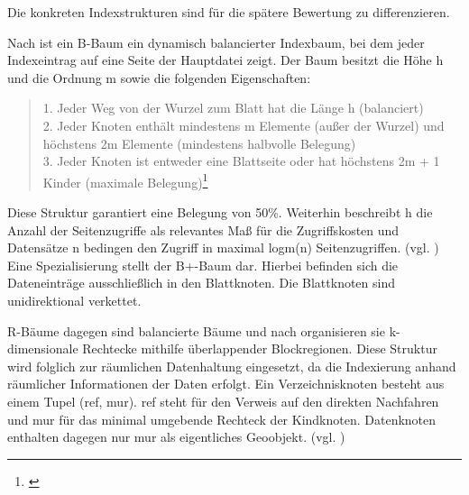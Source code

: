 Die konkreten Indexstrukturen sind für die spätere Bewertung zu differenzieren.


Nach \cite[S.288]{book:kudrass} ist ein B-Baum ein dynamisch balancierter Indexbaum, bei dem jeder Indexeintrag auf eine Seite der Hauptdatei zeigt.
Der Baum besitzt die Höhe h und die Ordnung m sowie die folgenden Eigenschaften:
\begin{quote}
1. Jeder Weg von der Wurzel zum Blatt hat die Länge h (balanciert)\\
2. Jeder Knoten enthält mindestens m Elemente (außer der Wurzel) und  höchstens 2m Elemente (mindestens halbvolle Belegung)\\
3. Jeder Knoten ist entweder eine Blattseite oder hat höchstens 2m + 1 Kinder (maximale Belegung)\footnote{\cite[S.284]{book:kudrass}}
\end{quote}
Diese Struktur garantiert eine Belegung von 50\%.
Weiterhin beschreibt h die Anzahl der Seitenzugriffe als relevantes Maß für die Zugriffskosten und Datensätze n bedingen den Zugriff in maximal logm(n) Seitenzugriffen. (vgl. \cite[S.288]{book:kudrass})
Eine Spezialisierung stellt der B+-Baum dar.
Hierbei befinden sich die Dateneinträge ausschließlich in den Blattknoten.
Die Blattknoten sind unidirektional verkettet.
%

R-Bäume dagegen sind balancierte Bäume und nach \cite[S. 523]{book:kudrass} organisieren sie k-dimensionale Rechtecke mithilfe überlappender Blockregionen.
Diese Struktur wird folglich zur räumlichen Datenhaltung eingesetzt, da die Indexierung anhand räumlicher Informationen der Daten erfolgt.
Ein Verzeichnisknoten besteht aus einem Tupel (ref, mur).
ref steht für den Verweis auf den direkten Nachfahren und mur für das minimal umgebende Rechteck der Kindknoten.
Datenknoten enthalten dagegen nur mur als eigentliches Geoobjekt. (vgl. \cite[S.523 ff.]{book:kudrass})


